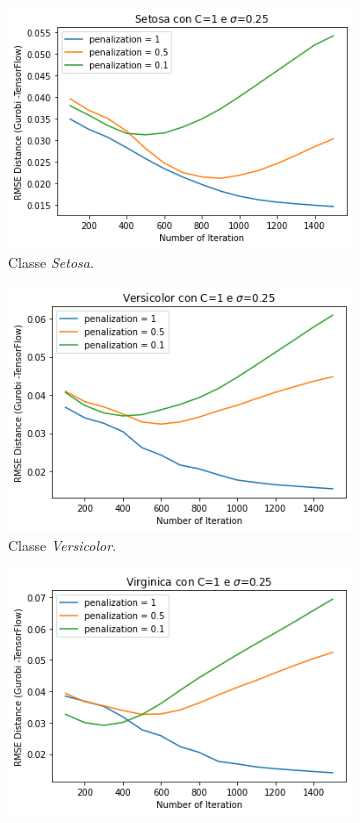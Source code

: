 \documentclass[a4paper,12pt]{report}
\begin{document}
\begin{figure}[H]
    \begin{subfigure}{0.47\textwidth}
        \centering
        \includegraphics[scale=0.5]{images/Grafici/Setosa_DiffPen.png}
        \caption{Classe \textit{Setosa}.}
        \label{subfig:Setosa_diffPen}
    \end{subfigure}
    \begin{subfigure}{0.47\textwidth}
        \centering
        \includegraphics[scale=0.5]{images/Grafici/Versicolor_DiffPen.png}
        \caption{Classe \textit{Versicolor}.}
        \label{subfig:Versicolor_diffPen}
    \end{subfigure}
    \newline
    \begin{subfigure}{\textwidth}
        \centering
        \includegraphics[scale=0.5]{images/Grafici/Virginica_DiffPen.png}

\end{subfigure}
\end{figure}
\end{document}
